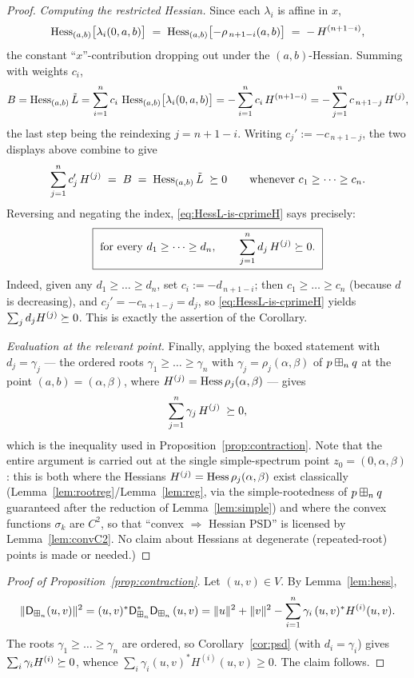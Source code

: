 \begin{proof}
\smallskip\noindent\emph{Computing the restricted Hessian.} Since each
$\lambda_i$ is affine in $x$,
\[
\operatorname{Hess}_{(a,b)}\bigl[\lambda_i(0,a,b)\bigr]
\;=\;\operatorname{Hess}_{(a,b)}\bigl[-\rho_{\,n+1-i}(a,b)\bigr]
\;=\;-\,H^{(n+1-i)},
\]
the constant ``$x$''-contribution dropping out under the $(a,b)$-Hessian. Summing
with weights $c_i$,
\[
B
=\operatorname{Hess}_{(a,b)}\tilde L
=\sum_{i=1}^n c_i\,\operatorname{Hess}_{(a,b)}\bigl[\lambda_i(0,a,b)\bigr]
=-\sum_{i=1}^n c_i\,H^{(n+1-i)}
=-\sum_{j=1}^n c_{\,n+1-j}\,H^{(j)},
\]
the last step being the reindexing $j=n+1-i$. Writing $c_j':=-c_{\,n+1-j}$,
the two displays above combine to give
\begin{equation}\label{eq:HessL-is-cprimeH}
\sum_{j=1}^n c_j'\,H^{(j)}\;=\;B\;=\;\operatorname{Hess}_{(a,b)}\tilde L\;\succeq 0
\qquad\text{whenever }c_1\ge\dots\ge c_n .
\end{equation}
Reversing and negating the index, \eqref{eq:HessL-is-cprimeH} says precisely:
\[
\boxed{\ \text{for every }d_1\ge\dots\ge d_n,\qquad \sum_{j=1}^n d_j\,H^{(j)}\qfourPSD.\ }
\]
Indeed, given any $d_1\ge\dots\ge d_n$, set $c_i:=-d_{\,n+1-i}$; then
$c_1\ge\dots\ge c_n$ (because $d$ is decreasing), and $c_j'=-c_{n+1-j}=d_j$, so
\eqref{eq:HessL-is-cprimeH} yields $\sum_j d_j H^{(j)}\succeq 0$. This is exactly the assertion of the Corollary.

\smallskip\noindent\textit{Evaluation at the relevant point.}
Finally, applying the boxed statement with $d_j=\gamma_j$ — the ordered roots
$\gamma_1\ge\dots\ge\gamma_n$ with $\gamma_j=\rho_j(\alpha,\beta)$ of $p\boxplus_n q$ at the point
$(a,b)=(\alpha,\beta)$, where $H^{(j)}=\operatorname{Hess}\rho_j(\alpha,\beta)$ — gives
\[
\sum_{j=1}^n \gamma_j\,H^{(j)}\;\succeq 0,
\]
which is the inequality used in Proposition~\ref{prop:contraction}. Note that the
entire argument is carried out at the single simple-spectrum point
$z_0=(0,\alpha,\beta)$: this is both where the Hessians $H^{(j)}=\operatorname{Hess}\rho_j(\alpha,\beta)$
exist classically (Lemma~\ref{lem:rootreg}/Lemma~\ref{lem:reg}, via the
simple-rootedness of $p\boxplus_n q$ guaranteed after the reduction of
Lemma~\ref{lem:simple}) and where the convex functions $\sigma_k$ are $C^2$, so
that ``convex $\Rightarrow$ Hessian PSD'' is licensed by Lemma~\ref{lem:convC2}.
No claim about Hessians at degenerate (repeated-root) points is made or needed.)
\end{proof}

\begin{proof}[Proof of Proposition~\ref{prop:contraction}]
Let $(u,v)\in V$. By Lemma~\ref{lem:hess},
\[
\|\mathsf{D}_{\boxplus_n}(u,v)\|^2=(u,v)^\ast \mathsf{D}_{\boxplus_n}^\ast\mathsf{D}_{\boxplus_n}\,(u,v)
=\|u\|^2+\|v\|^2-\sum_{i=1}^n\gamma_i\,(u,v)^\ast H^{(i)}(u,v).
\]
The roots $\gamma_1\ge\dots\ge\gamma_n$ are ordered, so
Corollary~\ref{cor:psd} (with $d_i=\gamma_i$) gives $\sum_i\gamma_i H^{(i)}\succeq 0$,
whence $\sum_i\gamma_i(u,v)^\ast H^{(i)}(u,v)\ge0$. The claim follows.
\end{proof}

